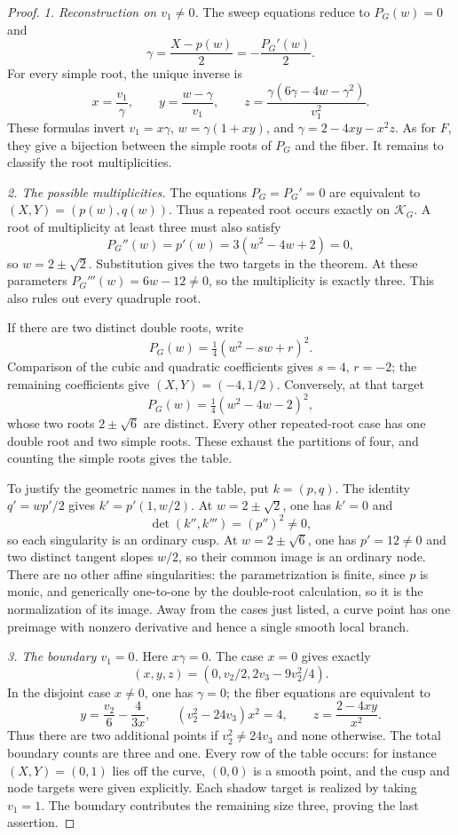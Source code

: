 \documentclass[11pt]{article}
\numberwithin{equation}{section}
\theoremstyle{plain}
\theoremstyle{definition}
\theoremstyle{remark}
\begin{document}
\begin{proof}
\emph{1. Reconstruction on $v_1\ne0$.}
The sweep equations reduce to $P_G(w)=0$ and
\[
 \gamma=\frac{X-p(w)}2=-\frac{P_G'(w)}2.
\]
For every simple root, the unique inverse is
\begin{equation}\label{eq:app-G-inverse}
 x=\frac{v_1}\gamma,\qquad y=\frac{w-\gamma}{v_1},\qquad
 z=\frac{\gamma(6\gamma-4w-\gamma^2)}{v_1^2}.
\end{equation}
These formulas invert $v_1=x\gamma$, $w=\gamma(1+xy)$, and
$\gamma=2-4xy-x^2z$. As for $F$, they give a bijection between the
simple roots of $P_G$ and the fiber. It remains to classify the root
multiplicities.

\emph{2. The possible multiplicities.}
The equations $P_G=P_G'=0$ are equivalent to
$(X,Y)=(p(w),q(w))$. Thus a repeated root occurs exactly on
$\mathcal K_G$. A root of multiplicity at least three must also satisfy
\[
 P_G''(w)=p'(w)=3(w^2-4w+2)=0,
\]
so $w=2\pm\sqrt2$. Substitution gives the two targets in the theorem.
At these parameters $P_G'''(w)=6w-12\ne0$, so the multiplicity is
exactly three. This also rules out every quadruple root.

If there are two distinct double roots, write
\[
 P_G(w)=\tfrac14(w^2-sw+r)^2.
\]
Comparison of the cubic and quadratic coefficients gives $s=4$,
$r=-2$; the remaining coefficients give $(X,Y)=(-4,1/2)$. Conversely,
at that target
\[
 P_G(w)=\tfrac14(w^2-4w-2)^2,
\]
whose two roots $2\pm\sqrt6$ are distinct. Every other repeated-root
case has one double root and two simple roots. These exhaust the
partitions of four, and counting the simple roots gives the table.

To justify the geometric names in the table, put $k=(p,q)$. The identity
$q'=wp'/2$ gives $k'=p'(1,w/2)$. At $w=2\pm\sqrt2$, one has
$k'=0$ and
\[
 \det(k'',k''')=(p'')^2\ne0,
\]
so each singularity is an ordinary cusp. At $w=2\pm\sqrt6$, one has
$p'=12\ne0$ and two distinct tangent slopes $w/2$, so their common
image is an ordinary node. There are no other affine singularities:
the parametrization is finite, since $p$ is monic, and generically
one-to-one by the double-root calculation, so it is the normalization
of its image. Away from the cases just
listed, a curve point has one preimage with nonzero derivative and
hence a single smooth local branch.

\emph{3. The boundary $v_1=0$.}
Here $x\gamma=0$. The case $x=0$ gives exactly
\[
 (x,y,z)=(0,v_2/2,2v_3-9v_2^2/4).
\]
In the disjoint case $x\ne0$, one has $\gamma=0$; the fiber equations
are equivalent to
\[
 y=\frac{v_2}6-\frac4{3x},\qquad
 (v_2^2-24v_3)x^2=4,\qquad z=\frac{2-4xy}{x^2}.
\]
Thus there are two additional points if $v_2^2\ne24v_3$ and none otherwise.
The total boundary counts are three and one. Every row of the table
occurs: for instance $(X,Y)=(0,1)$ lies off the curve, $(0,0)$ is a
smooth point, and the cusp and node targets were given explicitly.
Each shadow target is realized by taking $v_1=1$. The boundary contributes
the remaining size three, proving the last assertion.
\end{proof}
\end{document}

